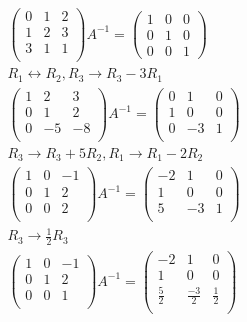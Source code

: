 \documentclass{article}
\begin{document}
\begin{gather*}
\begin{pmatrix}
0 & 1 & 2\\
1 & 2 & 3\\
3 & 1 & 1\\
\end{pmatrix}A^{-1} = \begin{pmatrix}
1 & 0 & 0\\
0 & 1 & 0\\
0 & 0 & 1
\end{pmatrix}\\
R_1 \leftrightarrow R_2 , R_3 \rightarrow R_3 - 3R_1\\
\begin{pmatrix}
1 & 2 & 3\\ 
0 & 1 & 2\\
0 & -5 & -8\\
\end{pmatrix} A^{-1} = \begin{pmatrix}
0 & 1 & 0\\
1 & 0 & 0\\
0 & -3 & 1 \\
\end{pmatrix}\\
R_3 \rightarrow R_3 + 5R_2, R_1 \rightarrow R_1 - 2R_2\\
\begin{pmatrix}
1 & 0 & -1\\
0 & 1 & 2\\
0 & 0 & 2\\
\end{pmatrix} A^{-1} = \begin{pmatrix}
-2 & 1 & 0\\
1 & 0 & 0 \\
5 & -3 & 1\\
\end{pmatrix}\\
R_3 \rightarrow \frac{1}{2} R_3\\
\begin{pmatrix}
1 & 0 & -1\\
0 & 1 & 2\\
0 & 0 & 1\\
\end{pmatrix} A^{-1} = \begin{pmatrix}
-2 & 1 & 0 \\
1 & 0 & 0 \\
\frac{5}{2} & \frac{-3}{2} & \frac{1}{2}\\
\end{pmatrix}\\
\end{gather*}
\end{document}
